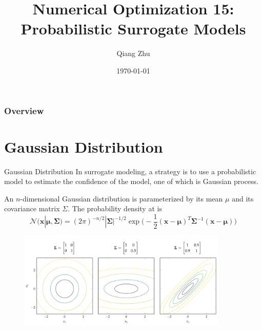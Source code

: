 \documentclass{beamer}
\title[Probabilistic Surrogate Models]{Numerical Optimization 15: Probabilistic Surrogate Models} %
\author{Qiang Zhu} %
\institute[University of Nevada Las Vegas] %
{
University of Nevada Las Vegas\\ %
\medskip
}
\date{\today} %
\begin{document}
\begin{frame}
\titlepage %
\end{frame}

\begin{frame}
\frametitle{Overview} %
\tableofcontents %
\end{frame}



\section{Gaussian Distribution}
\begin{frame}{Gaussian Distribution}
In surrogate modeling, a strategy is to use a probabilistic model to estimate the confidence of the model, one of which is Gaussian process.

An $n$-dimensional Gaussian distribution is parameterized by its mean $\mu$ and its covariance matrix $\Sigma$. The probability density at  is
\begin{equation*}
    \mathcal{N}(\boldsymbol{x}|\boldsymbol{\mu}, \boldsymbol{\Sigma}) =
    (2\pi)^{-n/2} |\boldsymbol{\Sigma}|^{-1/2} \exp\bigg(-\frac{1}{2}(\boldsymbol{x-\mu})^T \boldsymbol{\Sigma}^{-1}(\boldsymbol{x-\mu})\bigg)
\end{equation*}

\begin{figure}
\centering
\includegraphics[width=100mm]{Figs/gaussian.jpeg}
\end{figure}   

\end{frame}
\end{document}
